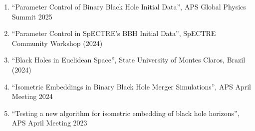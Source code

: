 \begin{enumerate}
		\setlength\itemsep{-0.1cm}
    \item ``Parameter Control of Binary Black Hole Initial Data'', APS Global Physics Summit 2025
    \item ``Parameter Control in SpECTRE's BBH Initial Data'', SpECTRE Community Workshop (2024)
    \item ``Black Holes in Euclidean Space'', State University of Montes Claros, Brazil (2024)
    \item ``Isometric Embeddings in Binary Black Hole Merger Simulations'', APS April Meeting 2024
    \item ``Testing a new algorithm for isometric embedding of black hole horizons'', APS April Meeting 2023
\end{enumerate}
